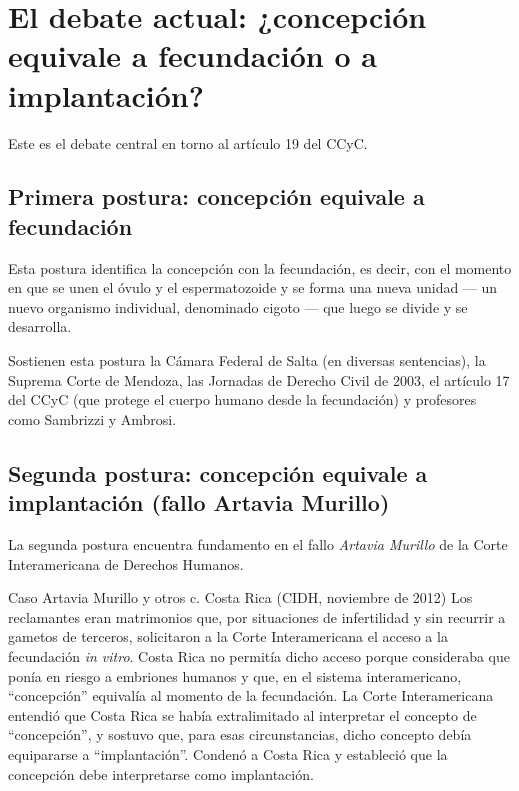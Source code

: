 \documentclass[12pt,oneside]{book}
\begin{document}
\section{El debate actual: ¿concepción equivale a fecundación o a implantación?}

Este es el debate central en torno al artículo 19 del CCyC.

\subsection{Primera postura: concepción equivale a fecundación}

Esta postura identifica la concepción con la fecundación, es decir, con el momento en que se unen el óvulo y el espermatozoide y se forma una nueva unidad --- un nuevo organismo individual, denominado cigoto --- que luego se divide y se desarrolla.

\begin{note}
Sostienen esta postura la Cámara Federal de Salta (en diversas sentencias), la Suprema Corte de Mendoza, las Jornadas de Derecho Civil de 2003, el artículo 17 del CCyC (que protege el cuerpo humano desde la fecundación) y profesores como Sambrizzi y Ambrosi.
\end{note}

\subsection{Segunda postura: concepción equivale a implantación (fallo Artavia Murillo)}

La segunda postura encuentra fundamento en el fallo \textit{Artavia Murillo} de la Corte Interamericana de Derechos Humanos.

\begin{example}{Caso Artavia Murillo y otros c. Costa Rica (CIDH, noviembre de 2012)}
Los reclamantes eran matrimonios que, por situaciones de infertilidad y sin recurrir a gametos de terceros, solicitaron a la Corte Interamericana el acceso a la fecundación \textit{in vitro}. Costa Rica no permitía dicho acceso porque consideraba que ponía en riesgo a embriones humanos y que, en el sistema interamericano, ``concepción'' equivalía al momento de la fecundación. La Corte Interamericana entendió que Costa Rica se había extralimitado al interpretar el concepto de ``concepción'', y sostuvo que, para esas circunstancias, dicho concepto debía equipararse a ``implantación''. Condenó a Costa Rica y estableció que la concepción debe interpretarse como implantación.
\end{example}
\end{document}
